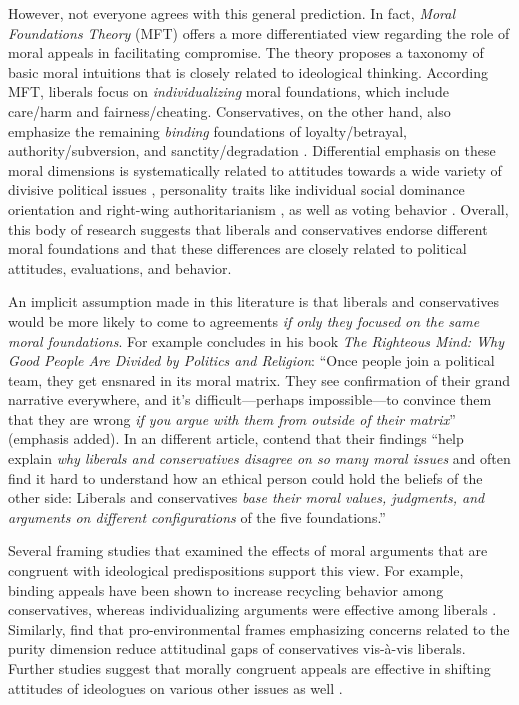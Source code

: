 However, not everyone agrees with this general prediction. In fact, \textit{Moral Foundations Theory} (MFT) offers a more differentiated view regarding the role of moral appeals in facilitating compromise. The theory proposes a taxonomy of basic moral intuitions that is closely related to ideological thinking. According MFT, liberals focus on \emph{individualizing} moral foundations, which include care/harm and fairness/cheating. Conservatives, on the other hand, also emphasize the remaining \emph{binding} foundations of loyalty/betrayal, authority/subversion, and sanctity/degradation \citep{haidt2007morality, graham2009liberals}. Differential emphasis on these moral dimensions is systematically related to attitudes towards a wide variety of divisive political issues \citep[e.g.][]{koleva2012tracing, kertzer2014moral, low2015moral}, personality traits like individual social dominance orientation and right-wing authoritarianism \citep{federico2013mapping}, as well as voting behavior \citep{franks2015using}. Overall, this body of research suggests that liberals and conservatives endorse different moral foundations and that these differences are closely related to political attitudes, evaluations, and behavior.

An implicit assumption made in this literature is that liberals and conservatives would be more likely to come to agreements \emph{if only they focused on the same moral foundations}. For example \citet[365]{haidt2012righteous} concludes in his book \emph{The Righteous Mind: Why Good People Are Divided by Politics and Religion}: ``Once people join a political team, they get ensnared in its moral matrix. They see confirmation of their grand
narrative everywhere, and it's difficult---perhaps impossible---to convince them that they are wrong \emph{if you argue with them from outside of their matrix}'' (emphasis added). In an different article, \citet[1040]{graham2009liberals} contend that their findings ``help explain \emph{why liberals and conservatives disagree on so many moral issues} and often find it hard to understand how an ethical person could hold the beliefs of the other side: Liberals and conservatives \emph{base their moral values, judgments, and arguments on different configurations} of the five foundations.''

Several framing studies that examined the effects of moral arguments that are congruent with ideological predispositions support this view. For example, binding appeals have been shown to increase recycling behavior among conservatives, whereas individualizing arguments were effective among liberals \citep{kidwell2013getting}. Similarly, \citet{feinberg2013moral} find that pro-environmental frames emphasizing concerns related to the purity dimension reduce attitudinal gaps of conservatives vis-\`a-vis liberals. Further studies suggest that morally congruent appeals are effective in shifting attitudes of ideologues on various other issues as well \citep[e.g.,][]{day2014shifting,feinberg2015gulf}.

